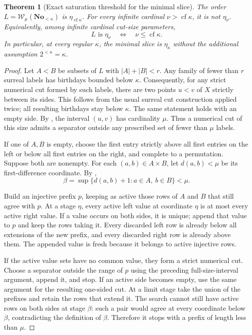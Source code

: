 \documentclass[11pt]{article}
\newtheorem{theorem}{Theorem}[section]
\theoremstyle{definition}
\theoremstyle{remark}
\newcommand{\No}{\mathbf{No}}
\newcommand{\WO}{\mathcal W}
\newcommand{\cf}{\operatorname{cf}}
\begin{document}
\begin{theorem}[Exact saturation threshold for the minimal slice]
\label{swo:cb:new:thm:saturation-threshold}
The order $L=\WO_\mu(\No_{<\kappa})$ is $\eta_{\cf\kappa}$.
For every infinite cardinal $\nu>\cf\kappa$, it is not $\eta_\nu$.
Equivalently, among infinite cardinal cut-size parameters,
\[
             L\text{ is }\eta_\nu
                \quad\Longleftrightarrow\quad \nu\leq\cf\kappa.
\]
In particular, at every regular $\kappa$, the minimal slice is
$\eta_\kappa$ without the additional assumption
$2^{<\kappa}=\kappa$.
\end{theorem}
\begin{proof}
Let $A<B$ be subsets of $L$ with $|A|+|B|<r$.
Any family of fewer than $r$ surreal labels has birthdays
bounded below $\kappa$.  Consequently, for any strict numerical cut
formed by such labels, there are two points $u<v$ of $X$ strictly
between its sides.  This follows from the usual surreal cut
construction applied twice; all resulting birthdays stay below
$\kappa$.  The same statement holds with an empty side.
By , the interval $(u,v)$ has
cardinality $\mu$.  Thus a numerical cut of this size admits a
separator outside any prescribed set of fewer than $\mu$ labels.

If one of $A,B$ is empty, choose the first entry strictly above all
first entries on the left or below all first entries on the right,
and complete to a permutation.  Suppose both are nonempty.  For
each $(a,b)\in A\times B$, let $d(a,b)<\mu$ be its first-difference
coordinate.  By ,
\[
        \beta=\sup\{d(a,b)+1:a\in A,\ b\in B\}<\mu.
\]

Build an injective prefix $p$, keeping as active those rows of
$A$ and $B$ that still agree with $p$.  At a stage $\eta$, every
active left value at coordinate $\eta$ is at most every active
right value.  If a value occurs on both sides, it is unique; append
that value to $p$ and keep the rows taking it.  Every discarded left
row is already below all extensions of the new prefix, and every
discarded right row is already above them.  The appended value is
fresh because it belongs to active injective rows.

If the active value sets have no common value, they form a strict
numerical cut.  Choose a separator outside the range of $p$ using
the preceding full-size-interval argument, append it, and stop.
If an active side becomes empty, use the same argument for the
resulting one-sided cut.  At a limit stage take the union of the
prefixes and retain the rows that extend it.  The search cannot
still have active rows on both sides at stage $\beta$: such a pair
would agree at every coordinate below $\beta$, contradicting the definition of
$\beta$.  Therefore it stops with a prefix of length less than
$\mu$.


\end{proof}
\end{document}
